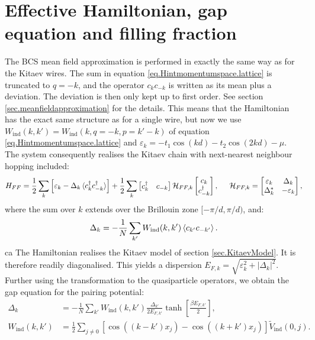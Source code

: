 \section{Effective Hamiltonian, gap equation and filling fraction} \label{sec.grandhamiltonian.lattice}
The BCS mean field approximation is performed in exactly the same way as for the Kitaev wires. The sum in equation \eqref{eq.Hintmomentumspace.lattice} is truncated to $q = -k$, and the operator $c_kc_{-k}$ is written as its mean plus a deviation. The deviation is then only kept up to first order. See section \ref{sec.meanfieldapproximation} for the details. This means that the Hamiltonian has the exact same structure as for a single wire, but now we use $W_{\text{ind}}(k, k') = W_{\text{ind}}(k, q = -k, p = k' - k)$ of equation \eqref{eq.Hintmomentumspace.lattice} and $\varepsilon_k = - t_1\cos(kd) - t_2\cos(2kd) - \mu$. The system consequently realises the Kitaev chain with next-nearest neighbour hopping included: 
\begin{equation}
H_{FF} = \frac{1}{2}\sum_k \left[\varepsilon_k - \Delta_k \braket {c^\dagger_k c^\dagger_{-k}}\right] + \frac{1}{2}\sum_{k} \begin{bmatrix} c_k^\dagger & c_{-k} \end{bmatrix} \mathcal{H}_{FF,k} \begin{bmatrix} c_k \\ c^\dagger_{-k} \end{bmatrix}, \hspace{0.5cm} \mathcal{H}_{FF,k} = \begin{bmatrix} \varepsilon_k & \Delta_k \\ \Delta^*_k & -\varepsilon_k \end{bmatrix}, 
\label{eq.grandhamiltonian.lattice}
\end{equation}
where the sum over $k$ extends over the Brillouin zone $[-\pi/d, \pi/d )$, and: 
\begin{equation}
\Delta_k = - \frac{1}{N}\sum_{k'} W_{\text{ind}}(k,k')\braket{c_{k'}c_{-k'}}.
\label{eq.pairingpotential.lattice}
\end{equation}ca
The Hamiltonian realises the Kitaev model of section \ref{sec.KitaevModel}. It is therefore readily diagonalised. This yields a dispersion $E_{F,k} = \sqrt{\varepsilon^2_k + |\Delta_k|^2}$. Further using the transformation to the quasiparticle operators, we obtain the gap equation for the pairing potential: 
\begin{align}
\Delta_k &= - \frac{1}{N}\sum_{k'} W_{\text{ind}}(k,k')\frac{\Delta_{k'}}{2E_{F,k'}}\tanh\left[\frac{\beta E_{F,k'}}{2}\right], \nonumber \\
W_{\text{ind}}(k,k') &= \frac{1}{2}\sum_{j\neq 0} \left[\cos((k - k')x_j) - \cos((k + k')x_j) \right]\tilde{V}_{\text{ind}}(0, j).
\label{eq.gapequation.lattice}
\end{align}
